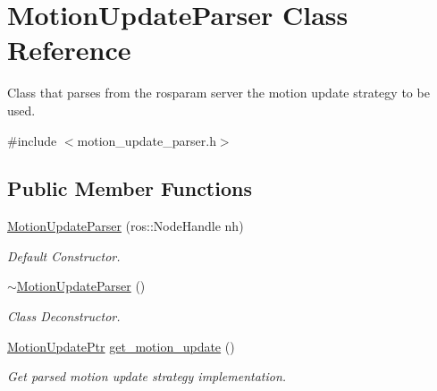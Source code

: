 \hypertarget{classMotionUpdateParser}{\section{Motion\-Update\-Parser Class Reference}
\label{classMotionUpdateParser}
}


Class that parses from the rosparam server the motion update strategy to be used.  




{\ttfamily \#include $<$motion\-\_\-update\-\_\-parser.\-h$>$}

\subsection*{Public Member Functions}
\begin{DoxyCompactItemize}
\item 
\hypertarget{classMotionUpdateParser_a497ae86be65c8c0e74fc1c7a6aa2f307}{\hyperlink{classMotionUpdateParser_a497ae86be65c8c0e74fc1c7a6aa2f307}{Motion\-Update\-Parser} (ros\-::\-Node\-Handle nh)}\label{classMotionUpdateParser_a497ae86be65c8c0e74fc1c7a6aa2f307}

\begin{DoxyCompactList}\small\item\em Default Constructor. \end{DoxyCompactList}\item 
\hypertarget{classMotionUpdateParser_a55e34b2f151f2d26565a36a7e8c216f7}{\hyperlink{classMotionUpdateParser_a55e34b2f151f2d26565a36a7e8c216f7}{$\sim$\-Motion\-Update\-Parser} ()}\label{classMotionUpdateParser_a55e34b2f151f2d26565a36a7e8c216f7}

\begin{DoxyCompactList}\small\item\em Class Deconstructor. \end{DoxyCompactList}\item 
\hypertarget{classMotionUpdateParser_a6cbea57e2617ccfaf523f3c04fbf7cf0}{\hyperlink{motion__update_8h_aec1cf0d54c70c4dacac639ab488bf948}{Motion\-Update\-Ptr} \hyperlink{classMotionUpdateParser_a6cbea57e2617ccfaf523f3c04fbf7cf0}{get\-\_\-motion\-\_\-update} ()}\label{classMotionUpdateParser_a6cbea57e2617ccfaf523f3c04fbf7cf0}

\begin{DoxyCompactList}\small\item\em Get parsed motion update strategy implementation. \end{DoxyCompactList}\end{DoxyCompactItemize}


